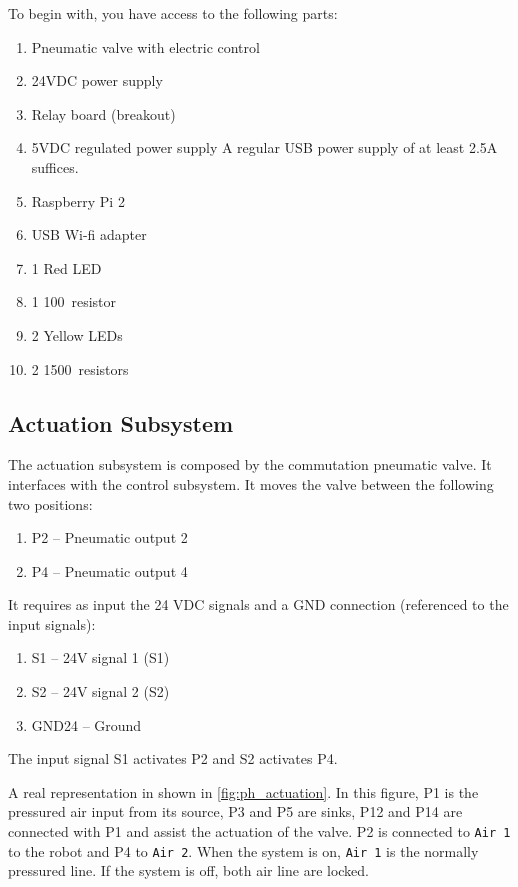 \documentclass[twoside,a4paper]{refart}
\begin{document}
To begin with, you have access to the following parts:
\begin{enumerate}
	
\item
Pneumatic valve with electric control
\item
24VDC power supply
\item
Relay board (breakout)
\item
5VDC regulated power supply
A regular USB power supply of at least 2.5A suffices. 
\item
Raspberry Pi 2
\item
USB Wi-fi adapter
\item
1 Red LED
\item
1 100\Omega \ resistor
\item
2 Yellow LEDs
\item
2 1500\Omega \ resistors
	
\end{enumerate}

\subsection{Actuation Subsystem}\label{sub:actuation_system}
The actuation subsystem is composed by the commutation pneumatic valve. It interfaces with the control subsystem. It moves the valve between the following two positions:

\begin{enumerate}
	\item
	P2 -- Pneumatic output 2
	\item
	P4 -- Pneumatic output 4 
\end{enumerate}

It requires as input the 24 VDC signals and a GND connection (referenced to the input signals):
\begin{enumerate}
	\item
	S1 -- 24V signal 1 (S1)
	\item
	S2 -- 24V signal 2 (S2)
	\item
	GND24 -- Ground
\end{enumerate}
The input signal S1 activates P2 and S2 activates P4.

A real representation in shown in \cref{fig:ph_actuation}. In this figure, P1 is the pressured air input from its source, P3 and P5 are sinks, P12 and P14 are connected with P1 and assist the actuation of the valve. P2 is connected to {\tt Air 1} to the robot and P4 to {\tt Air 2}. When the system is on, {\tt Air 1} is the normally pressured line. If the system is off, both air line are locked.
\end{document}
